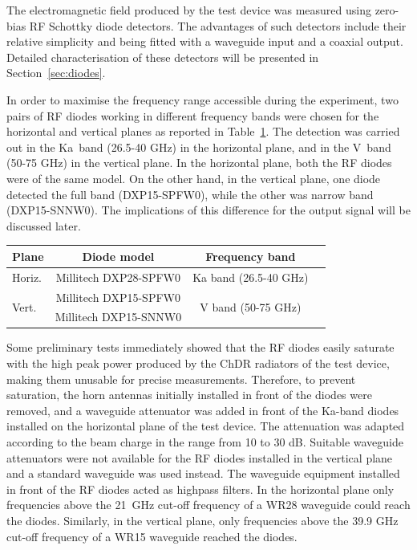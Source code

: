 The electromagnetic field produced by the test device was measured using zero-bias RF Schottky diode detectors. The advantages of such detectors include their relative simplicity and  being fitted with a waveguide input and a coaxial output. Detailed characterisation of these detectors will be presented in Section~\ref{sec:diodes}.

In order to maximise the frequency range accessible during the experiment, two pairs of RF diodes working in different frequency bands were chosen for the horizontal and vertical planes as reported in Table~\ref{tab:diodes_planes}. The detection was carried out in the Ka~band (26.5-40 GHz) in the horizontal plane, and in the V~band (50-75 GHz) in the vertical plane. In the horizontal plane, both the RF diodes were of the same model. On the other hand, in the vertical plane, one diode detected the full band (DXP15-SPFW0), while the other was narrow band (DXP15-SNNW0). The implications of this difference for the output signal will be discussed later.


\begin{table}[t]
\centering
    \begin{tabular}{l c c c}
    \toprule
    Plane & Diode model & Frequency band  \\
    \midrule
    Horiz. & Millitech DXP28-SPFW0 & Ka band (26.5-40 GHz)\\
    \multirow{2}{*}{Vert.} & Millitech DXP15-SPFW0 & \multirow{2}{*}{V band (50-75 GHz)}\\
     & Millitech DXP15-SNNW0 & \\


    \bottomrule
    \end{tabular}
   \label{tab:diodes_planes}
\end{table}


Some preliminary tests immediately showed that the RF diodes easily saturate with the high peak power produced by the ChDR radiators of the test device, making them unusable for precise measurements. Therefore, to prevent saturation, the horn antennas initially installed in front of the diodes were removed, and a waveguide attenuator was added in front of the Ka-band diodes installed on the horizontal plane of the test device. The attenuation was adapted according to the beam charge in the range from 10 to 30 dB. Suitable waveguide attenuators were not available for the RF diodes installed in the vertical plane and  a standard waveguide was used instead. The waveguide equipment installed in front of the RF diodes acted as highpass filters. In the horizontal plane only frequencies above the 21~GHz cut-off frequency of a WR28 waveguide could reach the diodes. Similarly, in the vertical plane, only frequencies above the 39.9 GHz cut-off frequency of a WR15 waveguide reached the diodes.


